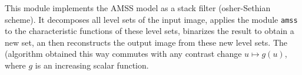 This module implements the AMSS 
model as a stack filter (osher-Sethian 
scheme). It decomposes all level sets of the input image,
applies the module \verb+amss+ to the characteristic functions of
these level sets,
binarizes the result to obtain a new set, an then
reconstructs the output image from these new level sets. 
The (algorithm obtained this way commutes with any contrast change
$u\mapsto g(u)$, where $g$ is an increasing scalar function.

